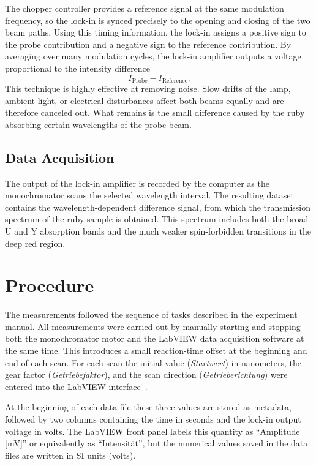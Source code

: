 \documentclass[a4paper]{article}
\begin{document}
The chopper controller provides a reference signal at the same modulation frequency, so the lock-in is synced precisely to the opening and closing of the two beam paths.
Using this timing information, the lock-in assigns a positive sign to the probe contribution and a negative sign to the reference contribution.
By averaging over many modulation cycles, the lock-in amplifier outputs a voltage proportional to the intensity difference
\[
I_{\mathrm{Probe}} - I_{\mathrm{Reference}}.
\]
This technique is highly effective at removing noise.
Slow drifts of the lamp, ambient light, or electrical disturbances affect both beams equally and are therefore canceled out.
What remains is the small difference caused by the ruby absorbing certain wavelengths of the probe beam.

\subsection{Data Acquisition}

The output of the lock-in amplifier is recorded by the computer as the monochromator scans the selected wavelength interval.
The resulting dataset contains the wavelength-dependent difference signal, from which the transmission spectrum of the ruby sample is obtained.
This spectrum includes both the broad U and Y absorption bands and the much weaker spin-forbidden transitions in the deep red region.



\section{Procedure}

The measurements followed the sequence of tasks described in the experiment manual.
All measurements were carried out by manually starting and stopping both the monochromator motor and the LabVIEW data acquisition software at the same time.
This introduces a small reaction-time offset at the beginning and end of each scan.
For each scan the initial value (\textit{Startwert}) in nanometers, the gear factor (\textit{Getriebefaktor}), and the scan direction (\textit{Getrieberichtung}) were entered into the LabVIEW interface~\cite{ISO_Datenaufnahme}.

At the beginning of each data file these three values are stored as metadata, followed by two columns containing the time in seconds and the lock-in output voltage in volts.
The LabVIEW front panel labels this quantity as ``Amplitude [mV]'' or equivalently as ``Intensität'', but the numerical values saved in the data files are written in SI units (volts).
\end{document}
